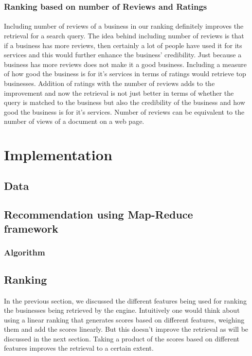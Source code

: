 \documentclass[paper=letter, fontsize=15pt]{article} %
\begin{document}
\subsubsection{Ranking based on number of Reviews and Ratings}
\paragraph{}Including number of reviews of a business in our ranking definitely improves the retrieval for a search query. The idea behind including number of reviews is that if a business has more reviews, then certainly a lot of people have used it for its services and this would further enhance the business' credibility. Just because a business has more reviews does not make it a good business. Including a measure of how good the business is for it's services in terms of ratings would retrieve top businesses. Addition of ratings with the number of reviews adds to the improvement and now the retrieval is not just better in terms of whether the query is matched to the business but also the credibility of the business and how good the business is for it's services. Number of reviews can be equivalent to the number of views of a document on a web page.    
\section{Implementation}
\subsection{Data}




\subsection{Recommendation using Map-Reduce framework}
\subsubsection{Algorithm}
\subsection{Ranking}
\paragraph{}In the previous section, we discussed the different features being used for ranking the businesses being retrieved by the engine. Intuitively one would think about using a linear ranking that generates scores based on different features, weighing them and add the scores linearly. But this doesn't improve the retrieval as will be discussed in the next section. Taking a product of the scores based on different features improves the retrieval to a certain extent. 
\end{document}
